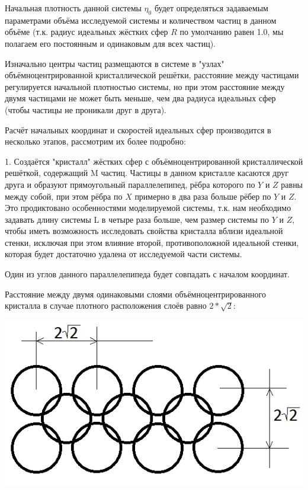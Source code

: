 \documentclass[a4paper]{article}
\begin{document}
Начальная плотность данной системы $ \eta_0 $ будет определяться задаваемым параметрами объёма исследуемой системы и количеством частиц в данном объёме (т.к. радиус идеальных жёстких сфер $R$ по умолчанию равен 1.0, мы полагаем его постоянным и одинаковым для всех частиц).

Изначально центры частиц размещаются в системе в "узлах" объёмноцентрированной кристаллической решётки, расстояние между частицами регулируется начальной плотностью системы, но при этом расстояние между двумя частицами не может быть меньше, чем два радиуса идеальных сфер (чтобы частицы не проникали друг в друга).

Расчёт начальных координат и скоростей идеальных сфер производится в несколько этапов, рассмотрим их более подробно:

1. Создаётся "кристалл" жёстких сфер с объёмноцентрированной кристаллической решёткой, содержащий M частиц. Частицы в данном кристалле касаются друг друга и образуют прямоугольный параллелепипед, рёбра которого по $ Y $ и $ Z $ равны между собой, при этом рёбра по $ X $ примерно в два раза больше рёбер по $ Y $ и $ Z $. Это продиктовано особенностями моделируемой системы, т.к. нам необходимо задавать длину системы L в четыре раза больше, чем размер системы по $ Y $ и $ Z $, чтобы иметь возможность исследовать свойства кристалла вблизи идеальной стенки, исключая при этом влияние второй, противоположной идеальной стенки, которая будет достаточно удалена от исследуемой части системы.

Один из углов данного параллелепипеда будет совпадать с началом координат.

Расстояние между двумя одинаковыми слоями объёмноцентрированного кристалла в случае плотного расположения слоёв равно $ 2*\sqrt{2} $:

\begin{center}
\includegraphics[scale=0.5]{distance_between_particles.png}
\end{center}
\end{document}
